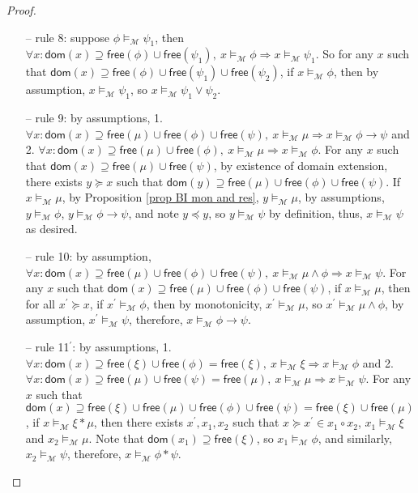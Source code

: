 \documentclass[conference,compsoc, 10pt]{IEEEtran}
\newcommand {\cM } {{\mathcal{M}}}
\newcommand {\Ldom }[1] {{\mathsf{dom}\!\left(#1\right)}}
\newcommand {\Lfree }[1] {{\mathsf{free}{\left(#1\right)}}}
\begin{document}
\begin{appendices}
\begin{proof}
\begin{itemize}
				\item[--] rule 8: suppose $\phi\models_\cM\psi_1$, then $\forall x: \Ldom{x}\supseteq\Lfree{\phi}\cup\Lfree{\psi_1}, \ x\models_\cM\phi\Rightarrow x\models_\cM\psi_1$. So for any $x$ such that $\Ldom{x}\supseteq\Lfree{\phi}\cup\Lfree{\psi_1}\cup\Lfree{\psi_2}$, if $x\models_\cM\phi$, then by assumption, $x\models_\cM\psi_1$, so $x\models_\cM\psi_1\vee\psi_2$.
				\item[--] rule 9: by assumptions, 1. $\forall x: \Ldom{x}\supseteq\Lfree{\mu}\cup\Lfree{\phi}\cup\Lfree{\psi}, \ x\models_\cM\mu\Rightarrow x\models_\cM\phi\rightarrow\psi$ and 2. $\forall x: \Ldom{x}\supseteq\Lfree{\mu}\cup\Lfree{\phi}, \ x\models_\cM\mu\Rightarrow x\models_\cM\phi$. For any $x$ such that $\Ldom{x}\supseteq \Lfree{\mu}\cup\Lfree{\psi}$, by existence of domain extension, there exists $y\succeq x$ such that $\Ldom{y}\supseteq\Lfree{\mu}\cup\Lfree{\phi}\cup\Lfree{\psi}$. If $x\models_\cM\mu$, by Proposition \ref{prop BI mon and res}, $y\models_\cM\mu$, by assumptions, $y\models_\cM\phi$, $y\models_\cM\phi\rightarrow\psi$, and note $y\preceq y$, so $y\models_\cM\psi$ by definition, thus, $x\models_\cM\psi$ as desired.
				\item[--] rule 10: by assumption,  $\forall x: \Ldom{x}\supseteq\Lfree{\mu}\cup\Lfree{\phi}\cup\Lfree{\psi}, \ x\models_\cM\mu\wedge\phi\Rightarrow x\models_\cM\psi$. For any $x$ such that $\Ldom{x}\supseteq\Lfree{\mu}\cup\Lfree{\phi}\cup\Lfree{\psi}$, if $x\models_\cM \mu$, then for all $x^\prime \succeq x$, if $x^\prime\models_\cM\phi$, then by monotonicity, $x^\prime\models_\cM \mu$, so $x^\prime\models_\cM\mu\wedge\phi$, by assumption, $x^\prime\models_\cM\psi$, therefore, $x\models_\cM \phi\rightarrow\psi$.
				\item[--] rule 11$^\prime$: by assumptions, 1. $\forall x: \Ldom{x}\supseteq\Lfree{\xi}\cup\Lfree{\phi} = \Lfree{\xi}, \ x\models_\cM\xi\Rightarrow x\models_\cM\phi$ and 2. $\forall x: \Ldom{x}\supseteq\Lfree{\mu}\cup\Lfree{\psi} = \Lfree{\mu}, \ x\models_\cM\mu\Rightarrow x\models_\cM\psi$. For any $x$ such that $\Ldom{x}\supseteq \Lfree{\xi}\cup\Lfree{\mu}\cup\Lfree{\phi}\cup\Lfree{\psi} = \Lfree{\xi}\cup\Lfree{\mu}$, if $x\models_\cM\xi\ast\mu$, then there exists $x^\prime,x_1,x_2$ such that $x\succeq x^\prime \in x_1\circ x_2$, $x_1\models_\cM \xi$ and $x_2\models_\cM \mu$. Note that $\Ldom{x_1}\supseteq\Lfree{\xi}$,  so $x_1\models_\cM \phi$, and similarly, $x_2\models_\cM \psi$, therefore, $x\models_\cM\phi\ast\psi$.

\end{itemize}
\end{proof}
\end{appendices}
\end{document}
